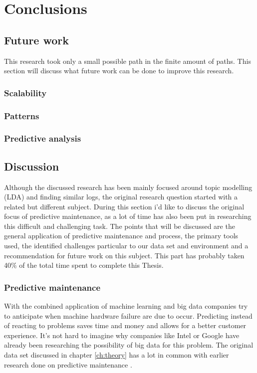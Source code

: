 \chapter{Conclusions} \label{ch:conclusions}

\section {Future work}
This research took only a small possible path in the finite amount of paths. This section will discuss what future work can be done to improve this research.

\subsection{Scalability}

\subsection{Patterns}

\subsection{Predictive analysis}


\section{Discussion}\label{conclusion:discussion}
Although the discussed research has been mainly focused around topic modelling (LDA) and finding similar logs, the original research question started with a related but different subject. During this section i'd like to discuss the original focus of predictive maintenance, as a lot of time has also been put in researching this difficult and challenging task. The points that will be discussed are the general application of predictive maintenance and process, the primary tools used, the identified challenges particular to our data set and environment and a recommendation for future work on this subject. This part has probably taken 40\% of the total time spent to complete this Thesis.

\subsection{Predictive maintenance}
With the combined application of machine learning and big data companies try to anticipate when machine hardware failure are due to occur. Predicting instead of reacting to problems saves time and money and allows for a better customer experience. It's not hard to imagine why companies like Intel \cite{AjayChandramoulyRavindraNarkhedeVijayMungaraGuillermoRueda2013ReducingAnalytics} or Google have already been researching the possibility of big data for this problem. 
The original data set discussed in chapter \ref{ch:theory} has a lot in common with earlier research done on predictive maintenance \cite{Sipos2014Log-basedMaintenance}.

